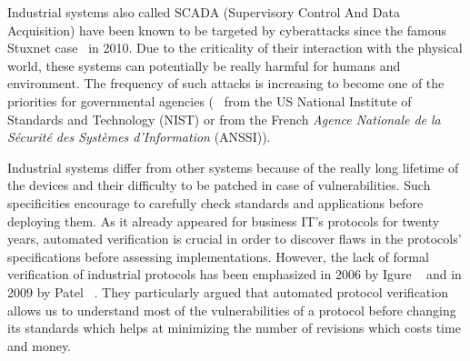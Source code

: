 Industrial systems also called SCADA (Supervisory Control And Data
Acquisition) have been known to be targeted by cyberattacks since the
famous Stuxnet case~\cite{Lan11} in 2010.  Due to the criticality of
their interaction with the physical world, these systems can
potentially be really harmful for humans and environment.  The
frequency of such attacks is increasing to become one of the priorities for
governmental agencies (\eg~\cite{SFS11} from the US National Institute of
Standards and Technology (NIST) or
\cite{ANSSI12_guide_securite_industrielle_en} from the French {\em Agence
Nationale de la Sécurité des Systèmes d'Information} (ANSSI)).


Industrial systems differ from other systems because of
the really long lifetime of the devices and their difficulty to
be patched in case of vulnerabilities.
Such specificities encourage to carefully check
standards and applications before deploying them.
As it already appeared for business IT's protocols for twenty years,
automated verification is crucial in order to discover flaws in the
protocols' specifications before assessing implementations. However,
the lack of formal verification of industrial protocols has been
emphasized in 2006 by Igure \etal~\cite{ILW06} and in 2009 by
Patel \emph{\etal}~\cite{PBG09}.  They particularly argued that
automated protocol verification allows us to understand most of the
vulnerabilities of a protocol before changing its standards which
helps at minimizing the number of revisions which costs time and
money. 


